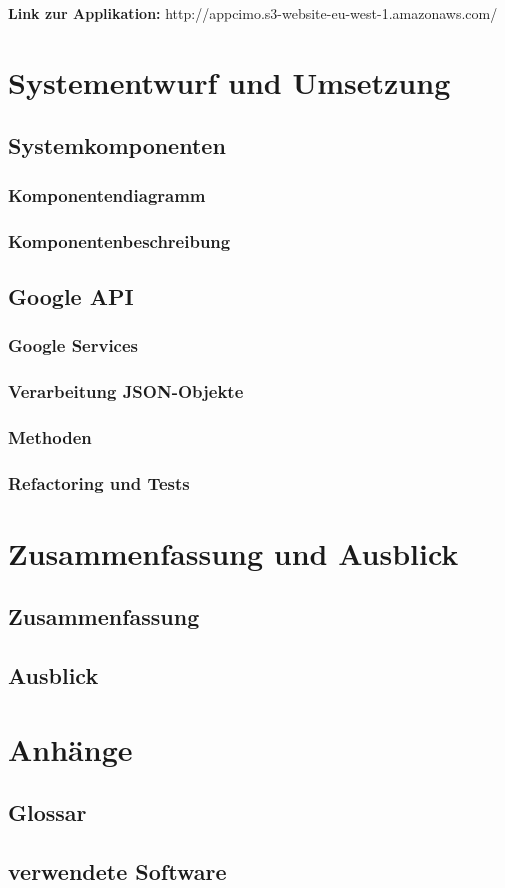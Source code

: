 \documentclass[a4paper, 11pt]{scrreprt}
\begin{document}
\textbf{Link zur Applikation: } http://appcimo.s3-website-eu-west-1.amazonaws.com/ 

\chapter{Systementwurf und Umsetzung}

\section{Systemkomponenten}

\subsection{Komponentendiagramm}

\subsection{Komponentenbeschreibung}

\section{Google API}

\subsection{Google Services}

\subsection{Verarbeitung JSON-Objekte}

\subsection{Methoden}

\subsection{Refactoring und Tests}

\chapter{Zusammenfassung und Ausblick}

\section{Zusammenfassung}

\section{Ausblick}

\chapter{Anhänge}

\section{Glossar}

\section{verwendete Software}
\end{document}
